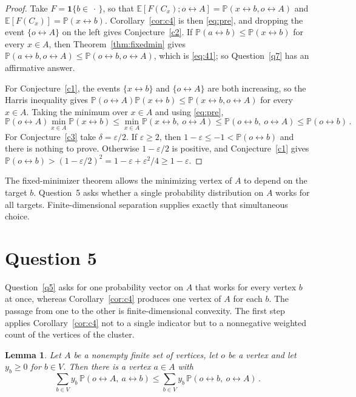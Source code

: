 \documentclass[11pt]{article}
\newtheorem{lemma}[theorem]{Lemma}
\theoremstyle{definition}
\theoremstyle{remark}
\newcommand{\PP}{\mathbb P}
\newcommand{\EE}{\mathbb E}
\newcommand{\one}{\mathbf 1}
\newcommand{\con}{\leftrightarrow}
\begin{document}
\begin{proof}
Take $F=\one\{b\in\,\cdot\,\}$, so that $\EE[F(C_x);o\con A]=\PP(x\con b,o\con A)$ and
$\EE[F(C_x)]=\PP(x\con b)$. Corollary~\ref{cor:c4} is then \eqref{eq:pre}, and dropping the
event $\{o\con A\}$ on the left gives Conjecture~\ref{c2}. If
$\PP(a\con b)\leq\PP(x\con b)$ for every $x\in A$, then
Theorem~\ref{thm:fixedmin} gives $\PP(a\con b,o\con A)\le\PP(o\con
b,o\con A)$, which is \eqref{eq:41}; so Question~\ref{q7} has an affirmative answer.

For Conjecture~\ref{c1}, the events $\{x\con b\}$ and $\{o\con A\}$ are both increasing, so
the Harris inequality gives $\PP(o\con A)\PP(x\con b)\le\PP(x\con b,o\con A)$ for every
$x\in A$. Taking the minimum over $x\in A$ and using \eqref{eq:pre},
\[
 \PP(o\con A)\min_{x\in A}\PP(x\con b)\leq \min_{x\in A}\PP(x\con b,\ o\con A)
\leq \PP(o\con b,\ o\con A)\leq \PP(o\con b)\,.
\]
For Conjecture~\ref{c3} take $\delta=\varepsilon/2$. If $\varepsilon\ge2$, then
$1-\varepsilon\le-1<\PP(o\con b)$ and there is nothing to prove. Otherwise
$1-\varepsilon/2$ is positive, and Conjecture~\ref{c1} gives $\PP(o\con
b)>(1-\varepsilon/2)^2=1-\varepsilon+\varepsilon^2/4\ge1-\varepsilon$.
\end{proof}

The fixed-minimizer theorem allows the minimizing vertex of $A$ to depend on the target $b$.
Question~5 asks whether a single probability distribution on $A$ works for all targets.
Finite-dimensional separation supplies exactly that simultaneous choice.

\section{Question 5}\label{sec:q5}

Question~\ref{q5} asks for one probability vector on $A$ that works for every vertex $b$ at
once, whereas Corollary~\ref{cor:c4} produces one vertex of $A$ for each $b$. The passage
from one to the other is finite-dimensional convexity. The first step applies
Corollary~\ref{cor:c4} not to a single indicator but to a nonnegative weighted count of the
vertices of the cluster.

\begin{lemma}\label{lem:q5dual}
Let $A$ be a nonempty finite set of vertices, let $o$ be a vertex and let $y_b\ge0$ for
$b\in V$. Then there is a vertex $a\in A$ with
\[
 \sum_{b\in V}y_b\,\PP(o\con A,\ a\con b)\leq \sum_{b\in V}y_b\,\PP(o\con b,\ o\con A)\,.
\]
\end{lemma}
\end{document}
